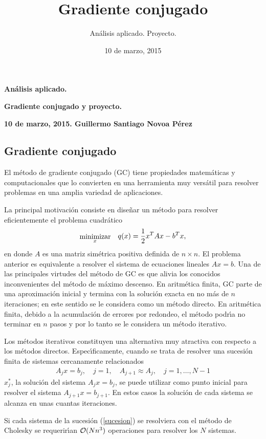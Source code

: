 \documentclass[12pt]{article}
\newcommand{\bea}{\begin{eqnarray}}
\newcommand{\eea}{\end{eqnarray}}
\begin{document}
\title{Gradiente conjugado}
\author{An\'alisis aplicado. Proyecto.}
\date{10 de marzo, 2015}

\centerline{\large \bf An\'alisis aplicado.}
\centerline{\large \bf Gradiente conjugado y proyecto.}
\centerline{\bf 10 de marzo, 2015. Guillermo Santiago Novoa P\'erez}

\subsection*{Gradiente conjugado}
El m\'etodo de gradiente conjugado (GC) tiene propiedades matem\'aticas y computacionales que lo convierten en una herramienta muy vers\'atil para resolver problemas  en una amplia variedad de aplicaciones. 

La principal motivaci\'on consiste en dise\~nar un m\'etodo para resolver eficientemente el problema cuadr\'atico
\bea  \label{opt}
  \stackrel{\mbox{minimizar}}{ {}_x } & & \raisebox{1.0ex}{$\displaystyle q(x) = \frac{1}{2} x^TAx -b^Tx$,}
\eea
en donde $A$ es una matriz sim\'etrica positiva definida de $n \times n$. El problema anterior es equivalente a resolver el  sistema de ecuaciones lineales $Ax = b$. Una de las principales virtudes del m\'etodo de GC es que alivia los conocidos inconvenientes del m\'etodo de m\'aximo descenso. En aritm\'etica finita,  GC parte de una aproximaci\'on inicial y termina con la soluci\'on exacta en no m\'as de $n$ iteraciones; en este sentido se le considera como un m\'etodo directo. En  aritm\'etica finita, debido a la acumulaci\'on de errores por redondeo, el m\'etodo podr\'{\i}a no terminar en $n$ pasos y por lo tanto se le considera un m\'etodo iterativo.

 Los m\'etodos iterativos constituyen una alternativa muy atractiva con respecto a los m\'etodos directos. Espec\'{\i}ficamente, cuando se trata de resolver una sucesi\'on finita de sistemas cercanamente relacionados 
\bea
   A_j x = b_j, \quad j=1, \quad A_{j+1} \approx A_j, \quad j=1,\ldots, N-1 \label{sucesion}
\eea
 $x_j^*$, la soluci\'on del sistema $A_j x = b_j$, se puede utilizar como punto inicial para resolver el sistema
$A_{j+1} x = b_{j+1}$. En estos casos la  soluci\'on de cada sistema se alcanza en unas cuantas iteraciones.

Si cada sistema de la  sucesi\'on (\ref{sucesion}) se resolviera con el m\'etodo de Cholesky se requerir\'{\i}an  ${\cal O}(Nn^3)$ operaciones para resolver los $N$ sistemas.
\end{document}
